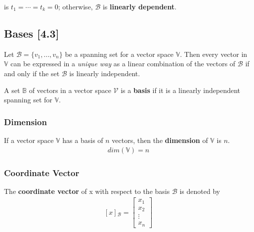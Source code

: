 \documentclass[a4paper,9pt]{extarticle}
\begin{document}
\begin{multicols*}{2}
is $t_1 = \cdots = t_k = 0$; otherwise, $\mathcal{B}$ is \textbf{linearly dependent}.


\subsection{Bases [4.3]}

Let $\mathcal{B} = \{v_1, ..., v_n\}$ be a spanning set for a vector space $\mathbb{V}$. Then every vector in $\mathbb{V}$ can be expressed in a \textit{unique way} as a linear combination of the vectors of $\mathcal{B}$ if and only if the set $\mathcal{B}$ is linearly independent.

A set $\mathbb{B}$ of vectors in a vector space $\mathcal{V}$ is a \textbf{basis} if it is a linearly independent spanning set for $\mathbb{V}$.


\subsubsection{Dimension}
If a vector space $\mathbb{V}$ has a basis of $n$ vectors, then the \textbf{dimension} of $\mathbb{V}$ is $n$.
\begin{equation} \label{4.3-1}
    \begin{split}
        dim(\mathbb{V}) = n
    \end{split}
\end{equation}


\subsubsection{Coordinate Vector}
The \textbf{coordinate vector} of x with respect to the basis $\mathcal{B}$ is denoted by
\begin{equation} \label{4.3-2}
    \begin{split}
        [x]{_\mathcal{B}} = \begin{bmatrix}x_1 \\ x_2 \\ \vdots \\ x_n \end{bmatrix}
    \end{split}
\end{equation}


\end{multicols*}
\end{document}
